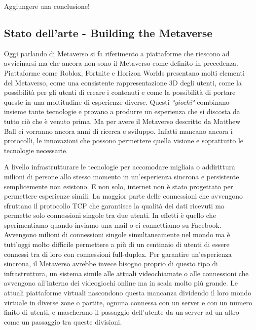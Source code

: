         Aggiungere una conclusione!

    \subsection{Stato dell'arte - Building the Metaverse}

    Oggi parlando di Metaverso si fa riferimento a piattaforme che riescono ad avvicinarsi ma che ancora non sono il Metaverso come definito in precedenza.
    Piattaforme come Roblox, Fortnite e Horizon Worlds presentano molti elementi del Metaverso, come una consistente rappresentazione 3D degli utenti, come la possibilità per gli utenti di creare i contenuti e come la possibilità di portare queste in una moltitudine di esperienze diverse. 
    Questi \textit{"giochi"} combinano insieme tante tecnologie e provano a produrre un esperienza che si discosta da tutto ciò che è venuto prima. Ma per avere il Metaverso descritto da Matthew Ball ci vorranno ancora anni di ricerca e sviluppo. 
    Infatti mancano ancora i protocolli, le innovazioni che possono permettere quella visione e soprattutto le tecnologie necessarie.
    
    A livello infrastrutturare le tecnologie per accomodare migliaia o addirittura milioni di persone allo stesso momento in un'esperienza sincrona e persistente semplicemente non esistono.
    E non solo, internet non è stato progettato per permettere esperienze simili.
    La maggior parte delle connessioni che avvengono sfruttano il protocollo TCP che garantisce la qualità dei dati ricevuti ma permette solo connessioni singole tra due utenti.
    In effetti è quello che sperimentiamo quando inviamo una mail o ci connettiamo su Facebook.
    Avvengono milioni di connessioni singole simultaneamente nel mondo ma è tutt'oggi molto difficile permettere a più di un centinaio di utenti di essere connessi tra di loro con connessioni full-duplex.
    Per garantire un'esperienza sincrona, il Metaverso avrebbe invece bisogno proprio di questo tipo di infrastruttura, un sistema simile alle attuali videochiamate o alle connessioni che avvengono all'interno dei videogiochi online ma in scala molto più grande.
    Le attuali piattaforme virtuali nascondono questa mancanza dividendo il loro mondo virtuale in diverse zone o partite, ognuna connessa con un server e con un numero finito di utenti, e mascherano il passaggio dell'utente da un server ad un altro come un passaggio tra queste divisioni.


